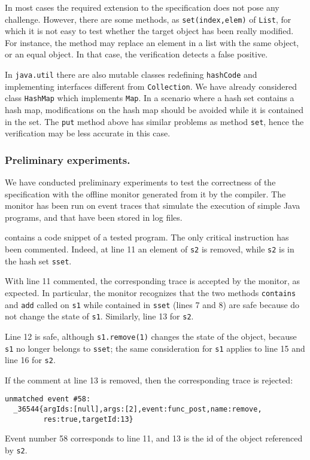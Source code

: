 In most cases the required extension to the specification does not pose any challenge. However, there are some methods, as
\lstinline{set(index,elem)} of \lstinline{List}, for which it is not easy to test whether the target object has been really modified.
For instance, the method
may replace an element in a list with the same object, or an equal object. In that case, the verification detects a false positive.

In \lstinline{java.util} there are also mutable classes redefining \lstinline{hashCode} and implementing interfaces different from
\lstinline{Collection}. We have already considered class \lstinline{HashMap} which implements \lstinline{Map}. In a scenario where
a hash set contains a hash map, modifications on the hash map should be avoided while it is contained in the set.
The \lstinline{put} method above has similar problems as method \lstinline{set}, hence the verification may be less accurate in this case.

\subsubsection*{Preliminary experiments.}
We have conducted preliminary experiments to test the correctness of the specification
with the offline monitor generated from it by the \rml compiler.
The monitor has been run on event traces that simulate the  execution of simple Java programs, and that have been stored in log files.

 contains a code snippet of a tested program. The only critical instruction has been commented.
Indeed, at line 11 an element of \lstinline{s2} is removed, while \lstinline{s2} is in the hash set \lstinline{sset}.

With line 11 commented, the corresponding trace is accepted by the monitor, as expected.
In particular, the monitor recognizes that the two methods \lstinline{contains} and \lstinline{add} called on \lstinline{s1}
while contained in \lstinline{sset} (lines 7 and 8) are safe because do not change the state of \lstinline{s1}. Similarly, line 13 for
\lstinline{s2}.

Line 12 is safe, although \lstinline{s1.remove(1)} changes the state of the object, because \lstinline{s1} no longer belongs to
\lstinline{sset}; the same consideration for \lstinline{s1} applies to line 15 and line 16 for \lstinline{s2}. 

If the comment at line 13 is removed, then the corresponding trace is rejected:
\begin{lstlisting}[language={},basicstyle=\ttfamily\scriptsize]
unmatched event #58:
  _36544{argIds:[null],args:[2],event:func_post,name:remove,
         res:true,targetId:13}
\end{lstlisting}
Event number 58 corresponds to line 11, and 13 is the id of the object referenced by \lstinline{s2}.   
